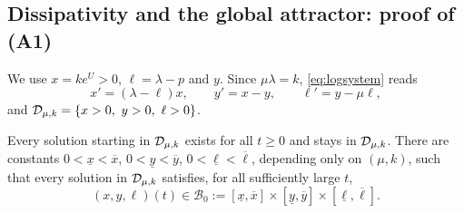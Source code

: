 \subsection{Dissipativity and the global attractor: proof of (A1)}\label{att:sec:diss}
We use $x=ke^{U}>0$, $\ell=\lambda-p$ and $y$. Since $\mu\lambda=k$, \eqref{eq:logsystem} reads
\begin{equation}\label{att:eq:xyl}
x'=(\lambda-\ell)x,\qquad y'=x-y,\qquad \ell'=y-\mu\ell,
\end{equation}
and $\Dom=\{x>0,\ y>0,\ \ell>0\}$.

\begin{lemma}\label{lem:absorbing}
Every solution starting in $\mathcal D_{\mu,k}$ exists for all $t\ge0$ and stays in $\mathcal D_{\mu,k}$. There are constants $0<\underline x<\overline x$, $0<\underline y<\overline y$, $0<\underline\ell<\overline\ell$, depending only on $(\mu,k)$, such that every solution in $\mathcal D_{\mu,k}$ satisfies, for all sufficiently large $t$,
\[
(x,y,\ell)(t)\in\mathcal B_0:=[\underline x,\overline x]\times[\underline y,\overline y]\times[\underline\ell,\overline\ell].
\]
\end{lemma}

